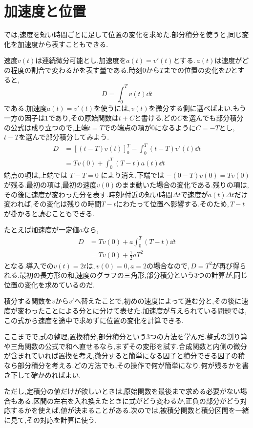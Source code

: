 \section{加速度と位置}\label{節:加速度と位置}
では,速度を短い時間ごとに足して位置の変化を求めた.部分積分を使うと,同じ変化を加速度から表すこともできる.

速度$v(t)$は連続微分可能とし,加速度を$a(t)=v'(t)$とする.\,$a(t)$は速度がどの程度の割合で変わるかを表す量である.時刻$0$から$T$までの位置の変化を$D$とすると,
\[
 D=\int_0^T v(t)\dd t
\]
である.加速度$a(t)=v'(t)$を使うには,\,$v(t)$を微分する側に選べばよい.もう一方の因子は$1$であり,その原始関数は$t+C$と書ける.どの$C$を選んでも部分積分の公式は成り立つので,上端$t=T$での端点の項が$0$になるように$C=-T$とし,\,$t-T$を選んで部分積分してみよう.
\[
\begin{aligned}
 D&=[(t-T)v(t)]_0^T-\int_0^T(t-T)v'(t)\dd t\\
 &=Tv(0)+\int_0^T(T-t)a(t)\dd t
\end{aligned}
\]
端点の項は,上端では $T-T=0$ により消え,下端では $-(0-T)v(0)=Tv(0)$ が残る.最初の項は,最初の速度$v(0)$のまま動いた場合の変化である.残りの項は,その後に速度が変わった分を表す.時刻$t$付近の短い時間$\Delta t$で速度が$a(t)\Delta t$だけ変われば,その変化は残りの時間$T-t$にわたって位置へ影響する.そのため,\,$T-t$が掛かると読むこともできる.

たとえば加速度が一定値$a$なら,
\[
\begin{aligned}
 D&=Tv(0)+a\int_0^T(T-t)\dd t\\
 &=Tv(0)+\frac12aT^2
\end{aligned}
\]
となる.導入での$v(t)=2t$は,\,$v(0)=0$,\,$a=2$の場合なので,\,$D=T^2$が再び得られる.最初の長方形の和,速度のグラフの三角形,部分積分という3つの計算が,同じ位置の変化を求めているのだ.

積分する関数を$v$から$v'$へ替えたことで,初めの速度によって進む分と,その後に速度が変わったことによる分とに分けて表せた.加速度が与えられている問題では,この式から速度を途中で求めずに位置の変化を計算できる.

ここまでで,式の整理,置換積分,部分積分という3つの方法を学んだ.整式の割り算や三角関数の公式で和へ直せるなら,まずその変形を試す.合成関数と内側の微分が含まれていれば置換を考え,微分すると簡単になる因子と積分できる因子の積なら部分積分を考える.どの方法でも,その操作で何が簡単になり,何が残るかを書き下して確かめればよい.

ただし,定積分の値だけが欲しいときは,原始関数を最後まで求める必要がない場合もある.区間の左右を入れ換えたときに式がどう変わるか,正負の部分がどう対応するかを使えば,値が決まることがある.次のでは,被積分関数と積分区間を一緒に見て,その対応を計算に使う.
